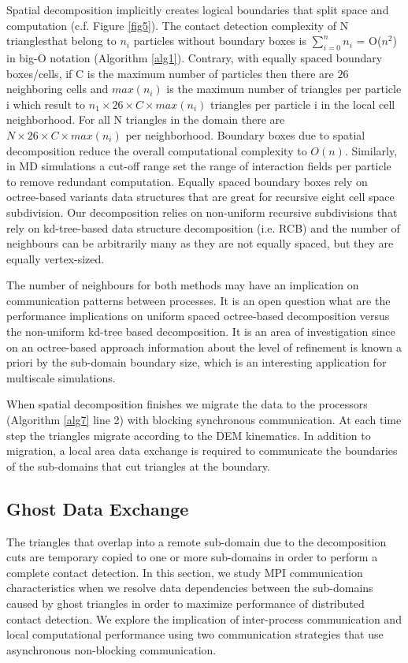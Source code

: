 \documentclass[times,12pt]{article}
\begin{document}
Spatial decomposition implicitly creates logical boundaries that split space and computation (c.f. Figure \ref{fig5}). The contact detection complexity of N trianglesthat belong to $n_{i}$ particles without boundary boxes is $\sum\limits_{i=0}^n n_{i}$ = O($n^2$) in big-O notation (Algorithm \ref{alg1}). Contrary, with equally spaced boundary boxes/cells, if C is the maximum number of particles then there are $26$ neighboring cells and $max(n_{i})$ is the maximum number of triangles per particle i which result to $n_{1} \times 26 \times C \times max(n_{i})$ triangles per particle i in the local cell neighborhood. For all N triangles in the domain there are $N \times 26 \times C \times max(n_{i})$ per neighborhood. Boundary boxes due to spatial decomposition reduce the overall computational complexity to $O(n)$. Similarly, in MD simulations a cut-off range set the range of interaction fields per particle to remove redundant computation. Equally spaced boundary boxes rely on octree-based variants data structures that are great for recursive eight cell space subdivision. Our decomposition relies on non-uniform recursive subdivisions that rely on kd-tree-based data structure decomposition \cite{Brown2015} (i.e. RCB) and the number of neighbours can be arbitrarily many as they are not equally spaced, but they are equally vertex-sized. 

The number of neighbours for both methods may have an implication on communication patterns between processes. It is an open question what are the performance implications on uniform spaced octree-based decomposition versus the non-uniform kd-tree based decomposition. It is an area of investigation since on an octree-based approach information about the level of refinement is known a priori by the sub-domain boundary size, which is an interesting application for multiscale simulations. 

When spatial decomposition finishes we migrate the data to the processors (Algorithm \ref{alg7} line 2) with blocking synchronous communication. At each time step the triangles migrate according to the DEM kinematics. In addition to migration, a local area data exchange is required to communicate the boundaries of the sub-domains that cut triangles at the boundary. 

\subsection{Ghost Data Exchange}

The triangles that overlap into a remote sub-domain due to the decomposition cuts are temporary copied to one or more sub-domains in order to perform a complete contact detection. In this section, we study MPI communication characteristics when we resolve data dependencies between the sub-domains caused by ghost triangles in order to maximize performance of distributed contact detection. We explore the implication of inter-process communication and local computational performance using two communication strategies that use asynchronous non-blocking communication.
\end{document}
